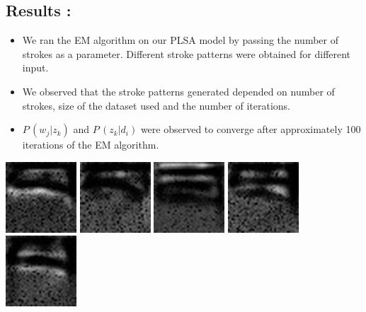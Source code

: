 \documentclass[10pt]{article}
\begin{document}
		\subsection{Results :}
			\begin{itemize}
				\item
				We ran the EM algorithm on our PLSA model by passing the number of strokes as a parameter. Different stroke patterns were obtained for different input.
				\item
				We observed that the stroke patterns generated depended on number of strokes, size of the dataset used and the number of iterations.
				\item
				$P\,(w_j|z_k)$ and $P\,(z_k|d_i)$ were observed to converge after approximately 100 iterations of the EM algorithm.
			\end{itemize}
			\begin{center}
				\includegraphics{stro0.jpg}
				\includegraphics{stro1.jpg}
				\includegraphics{stro2.jpg}
				\includegraphics{stro3.jpg} \\
				\includegraphics{stro4.jpg}

\end{center}
\end{document}

